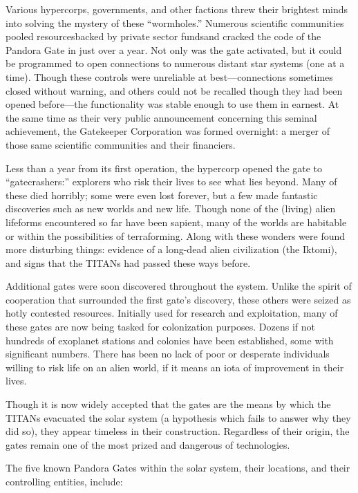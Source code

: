 Various hypercorps, governments, and other factions threw their
brightest minds into solving the mystery of these “wormholes.”
Numerous scientific communities pooled resourcesbacked by private
sector fundsand cracked the code of the Pandora Gate in just over a
year.  Not only was the gate activated, but it could be programmed to
open connections to numerous distant star systems (one at a
time). Though these controls were unreliable at best—connections
sometimes closed without warning, and others could not be recalled
though they had been opened before—the functionality was stable enough
to use them in earnest. At the same time as their very public
announcement concerning this seminal achievement, the Gatekeeper
Corporation was formed overnight: a merger of those same scientific
communities and their financiers.

Less than a year from its first operation, the hypercorp opened the
gate to “gatecrashers:” explorers who risk their lives to see what
lies beyond. Many of these died horribly; some were even lost forever,
but a few made fantastic discoveries such as new worlds and new
life. Though none of the (living) alien lifeforms encountered so far
have been sapient, many of the worlds are habitable or within the
possibilities of terraforming. Along with these wonders were found
more disturbing things: evidence of a long-dead alien civilization
(the Iktomi), and signs that the TITANs had passed these ways before.

Additional gates were soon discovered throughout the system. Unlike
the spirit of cooperation that surrounded the first gate’s discovery,
these others were seized as hotly contested resources. Initially used
for research and exploitation, many of these gates are now being
tasked for colonization purposes.  Dozens if not hundreds of exoplanet
stations and colonies have been established, some with significant
numbers. There has been no lack of poor or desperate individuals
willing to risk life on an alien world, if it means an iota of
improvement in their lives.

Though it is now widely accepted that the gates are the means by which
the TITANs evacuated the solar system (a hypothesis which fails to
answer why they did so), they appear timeless in their
construction. Regardless of their origin, the gates remain one of the
most prized and dangerous of technologies.

The five known Pandora Gates within the solar system, their locations,
and their controlling entities, include:

